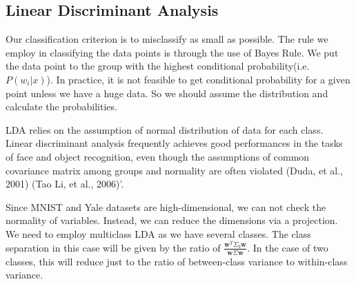 \subsection{Linear Discriminant Analysis}

Our classification criterion is to misclassify as small as possible. The rule we employ in classifying the data points is through the use of Bayes Rule. We put the data point to the group with the highest conditional probability(i.e. $P(w_i|x)$). In practice, it is not feasible to get conditional probability for a given point unless we have a huge data. So we should assume the distribution and calculate the probabilities. 

LDA relies on the assumption of normal distribution of data for each class. Linear discriminant analysis frequently achieves good performances in the tasks of face and object recognition, even though the assumptions of common covariance matrix among groups and normality are often violated (Duda, et al., 2001) (Tao Li, et al., 2006)'.

Since MNIST and Yale datasets are high-dimensional, we can not check the normality of variables. Instead, we can reduce the dimensions via a projection.
We need to employ multiclass LDA as we have several classes. The class separation in this case will be given by the ratio of $\frac{\pmb w^T \Sigma_b \pmb w}{\pmb w \Sigma \pmb w}$. In the case of two classes, this will reduce just to the ratio of between-class variance to within-class variance.

